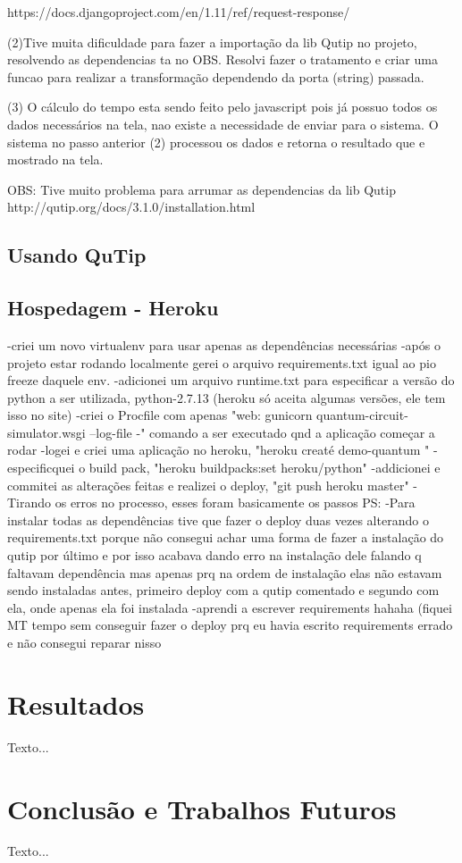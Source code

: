 \documentclass[a4paper, 12pt, oneside]{book}
\begin{document}
https://docs.djangoproject.com/en/1.11/ref/request-response/

(2)Tive muita dificuldade para fazer a importação da lib Qutip no projeto, resolvendo as dependencias ta no OBS. Resolvi fazer o tratamento e criar uma funcao para realizar a transformação dependendo da porta (string) passada.

(3) O cálculo do tempo esta sendo feito pelo javascript pois já possuo todos os dados necessários na tela, nao existe a necessidade de enviar para o sistema. O sistema no passo anterior (2) processou os dados e retorna o resultado que e mostrado na tela.

OBS: Tive muito problema para arrumar as dependencias da lib Qutip
http://qutip.org/docs/3.1.0/installation.html

\section{Usando QuTip}


\section{Hospedagem - Heroku}

-criei um novo virtualenv para usar apenas as dependências necessárias
-após o projeto estar rodando localmente gerei o arquivo requirements.txt igual ao pio freeze daquele env.
-adicionei um arquivo runtime.txt para especificar a versão do python a ser utilizada, python-2.7.13 (heroku só aceita algumas versões, ele tem isso no site)
-criei o Procfile com apenas "web: gunicorn quantum-circuit-simulator.wsgi --log-file -" comando a ser executado qnd a aplicação começar a rodar
-logei e criei uma aplicação no heroku, "heroku creaté demo-quantum "
-especificquei o build pack, "heroku buildpacks:set heroku/python"
-addicionei e commitei as alterações feitas e realizei o deploy, "git push heroku master"
-Tirando os erros no processo, esses foram basicamente os passos
PS:
-Para instalar todas as dependências tive que fazer o deploy duas vezes alterando o requirements.txt porque não consegui achar uma forma de fazer a instalação do qutip por último e por isso acabava dando erro na instalação dele falando q faltavam dependência mas apenas prq na ordem de instalação elas não estavam sendo instaladas antes, primeiro deploy com a qutip comentado e segundo com ela, onde apenas ela foi instalada
-aprendi a escrever requirements hahaha (fiquei MT tempo sem conseguir fazer o deploy prq eu havia escrito requirements errado e não consegui reparar nisso


\chapter{Resultados}
\thispagestyle{empty} 

Texto...

\chapter{Conclusão e Trabalhos Futuros}
\thispagestyle{empty} 

Texto...



\end{document}
